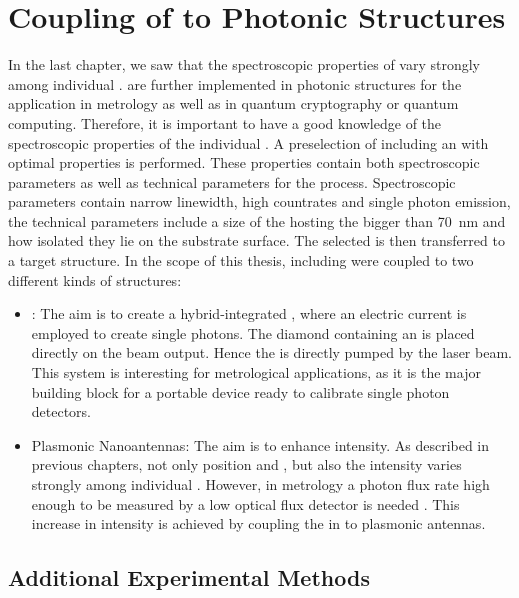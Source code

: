 
\chapter{Coupling of \Nds to Photonic Structures}	\label{ch::coupling}

	In the last chapter, we saw that the spectroscopic properties of \sivs vary strongly among individual \nds.
	\Nds are further implemented in photonic structures for the application in metrology as well as in quantum cryptography or quantum computing.
	Therefore, it is important to have a good knowledge of the spectroscopic properties of the individual  \siv.
	A preselection of \nds including an \siv with optimal properties is performed.
	These properties contain both spectroscopic parameters as well as technical parameters for the \pp process.
	Spectroscopic parameters contain narrow linewidth, high countrates and single photon emission, the technical parameters include a size of the \nds hosting the \siv bigger than \SI{70}{nm} and how isolated they lie on the substrate surface.
	The selected \nd is then transferred to a target structure.
	In the scope of this thesis, \nds including \sivs were coupled to two different kinds of structures:
	\begin{itemize}
		\item \Vcsels: The aim is to create a hybrid-integrated \sps, where an electric current is employed to create single photons. The diamond containing an \siv is placed directly on the beam output. Hence the \siv is directly pumped by the laser beam. This system is interesting for metrological applications, as it is the major building block for a portable device ready to calibrate single photon detectors.
		\item Plasmonic Nanoantennas: The aim is to enhance \pl intensity. As described in previous chapters, not only \ZPL position and \lw, but also the \pl intensity varies strongly among individual \sivs. However, in metrology a photon flux rate high enough to be measured by a low optical flux detector is needed \cite{Vaigu2017}. This increase in intensity is achieved by coupling the \sivs in \nds to plasmonic antennas.
	\end{itemize}


	\section{Additional Experimental Methods} \label{sec::methods_coupling}


